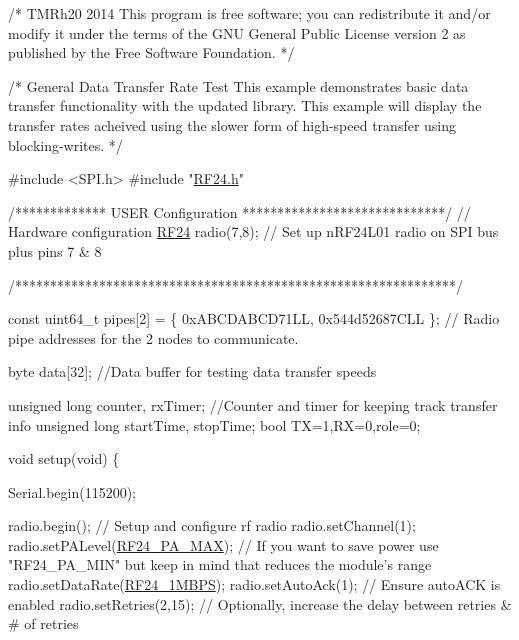 \begin{DoxyCodeInclude}
\textcolor{comment}{/*}
\textcolor{comment}{ TMRh20 2014}
\textcolor{comment}{}
\textcolor{comment}{ This program is free software; you can redistribute it and/or}
\textcolor{comment}{ modify it under the terms of the GNU General Public License}
\textcolor{comment}{ version 2 as published by the Free Software Foundation.}
\textcolor{comment}{ */}

\textcolor{comment}{/*}
\textcolor{comment}{ General Data Transfer Rate Test}
\textcolor{comment}{ }
\textcolor{comment}{ This example demonstrates basic data transfer functionality with the }
\textcolor{comment}{ updated library. This example will display the transfer rates acheived }
\textcolor{comment}{ using the slower form of high-speed transfer using blocking-writes.}
\textcolor{comment}{ */}


\textcolor{preprocessor}{#include <SPI.h>}
\textcolor{preprocessor}{#include "\hyperlink{RF24_8h}{RF24.h}"}

\textcolor{comment}{/*************  USER Configuration *****************************/}
                                           \textcolor{comment}{// Hardware configuration}
\hyperlink{classRF24}{RF24} radio(7,8);                           \textcolor{comment}{// Set up nRF24L01 radio on SPI bus plus pins 7 & 8}

\textcolor{comment}{/***************************************************************/}

\textcolor{keyword}{const} uint64\_t pipes[2] = \{ 0xABCDABCD71LL, 0x544d52687CLL \};   \textcolor{comment}{// Radio pipe addresses for the 2 nodes to
       communicate.}

byte data[32];                             \textcolor{comment}{//Data buffer for testing data transfer speeds}

\textcolor{keywordtype}{unsigned} \textcolor{keywordtype}{long} counter, rxTimer;            \textcolor{comment}{//Counter and timer for keeping track transfer info}
\textcolor{keywordtype}{unsigned} \textcolor{keywordtype}{long} startTime, stopTime;  
\textcolor{keywordtype}{bool} TX=1,RX=0,role=0;

\textcolor{keywordtype}{void} setup(\textcolor{keywordtype}{void}) \{

  Serial.begin(115200);

  radio.begin();                           \textcolor{comment}{// Setup and configure rf radio}
  radio.setChannel(1);
  radio.setPALevel(\hyperlink{RF24_8h_a1e4cd0bea93e6b43422855fb0120aaceab0bfc94c4095e9495b2e49530b623d0d}{RF24\_PA\_MAX});           \textcolor{comment}{// If you want to save power use "RF24\_PA\_MIN" but
       keep in mind that reduces the module's range}
  radio.setDataRate(\hyperlink{RF24_8h_a82745de4aa1251b7561564b3ed1d6522afd01f3fd55247a67c0bcfd459fe17fdf}{RF24\_1MBPS});
  radio.setAutoAck(1);                     \textcolor{comment}{// Ensure autoACK is enabled}
  radio.setRetries(2,15);                  \textcolor{comment}{// Optionally, increase the delay between retries & # of retries}
  

\end{DoxyCodeInclude}
